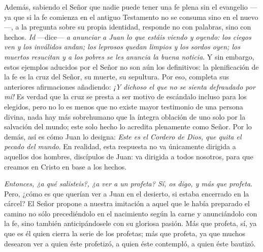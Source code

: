 \begin{body}
	Además, sabiendo el Señor que nadie puede tener una fe plena sin el evangelio ---ya que si la fe comienza en el antiguo Testamento no se consuma sino en el nuevo---, a la pregunta sobre su propia identidad, responde no con palabras, sino con hechos. \emph{Id} ---dice--- \emph{a anunciar a Juan lo que estáis viendo y oyendo: los ciegos ven y los inválidos andan; los leprosos quedan limpios y los sordos oyen; los muertos resucitan y a los pobres se les anuncia la buena noticia}. Y sin embargo, estos ejemplos aducidos por el Señor no son aún los definitivos: la plenificación de la fe es la cruz del Señor, su muerte, su sepultura. Por eso, completa sus anteriores afirmaciones añadiendo: \emph{¡Y dichoso el que no se sienta defraudado por mí!} Es verdad que la cruz se presta a ser motivo de escándalo incluso para los elegidos, pero no lo es menos que no existe mayor testimonio de una persona divina, nada hay más sobrehumano que la íntegra oblación de uno solo por la salvación del mundo; este solo hecho lo acredita plenamente como Señor. Por lo demás, así es cómo Juan lo designa: \emph{Este es el Cordero de Dios, que quita el pecado del mundo}. En realidad, esta respuesta no va únicamente dirigida a aquellos dos hombres, discípulos de Juan: va dirigida a todos nosotros, para que creamos en Cristo en base a los hechos. 
	
	\emph{Entonces, ¿a qué salisteis?, ¿a ver a un profeta? Sí, os digo, y más que profeta}. Pero, ¿cómo es que querían ver a Juan en el desierto, si estaba encerrado en la cárcel? El Señor propone a nuestra imitación a aquel que le había preparado el camino no sólo precediéndolo en el nacimiento según la carne y anunciándolo con la fe, sino también anticipándosele con su gloriosa pasión. Más que profeta, sí, ya que es él quien cierra la serie de los profetas; más que profeta, ya que muchos desearon ver a quien éste profetizó, a quien éste contempló, a quien éste bautizó.
\end{body}